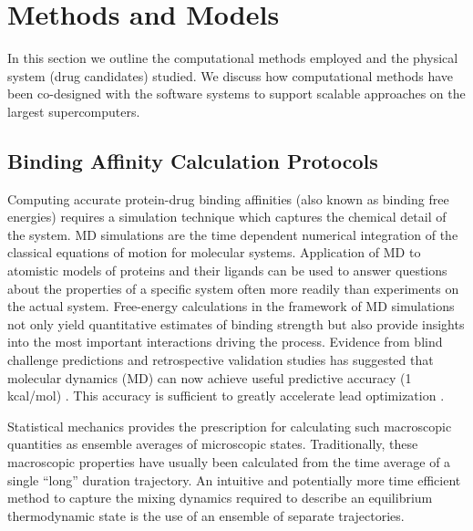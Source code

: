 \documentclass[conference]{IEEEtran}
\begin{document}
 
\section{Methods and Models}

In this section we outline the computational methods employed and the physical
system (drug candidates) studied. We discuss how computational methods have
been co-designed with the software systems to support scalable approaches on
the largest supercomputers.

\subsection{Binding Affinity Calculation Protocols}\label{sec:bac}

Computing accurate protein-drug binding affinities (also known as binding free
energies) requires a simulation technique which captures the chemical detail
of the system. MD simulations are the time dependent numerical integration of
the classical equations of motion for molecular systems. Application of MD to
atomistic models of proteins and their ligands can be used to answer questions
about the properties of a specific system often more readily than experiments
on the actual system. Free-energy calculations in the framework of MD
simulations not only yield quantitative estimates of binding strength but also
provide insights into the most important interactions driving the process.
Evidence from blind challenge predictions and retrospective validation studies
has suggested that molecular dynamics (MD) can now achieve useful predictive
accuracy (1 kcal/mol) 
\cite{shirts-mobley-chodera:2007:annu-rep-comput-chem:prime-time, abel:jacs:2015:fep-plus}. This accuracy is sufficient to greatly
accelerate lead optimization \cite{shirts-mobley-brown:2009:sbdd}.

Statistical mechanics provides the prescription for calculating such
macroscopic quantities as ensemble averages of microscopic states.
Traditionally, these macroscopic properties have usually been calculated from
the time average of a single “long” duration trajectory. An intuitive and
potentially more time efficient method to capture the mixing dynamics required
to describe an equilibrium thermodynamic state is the use of an ensemble of
separate trajectories. \cite{Coveney2016}
\end{document}
